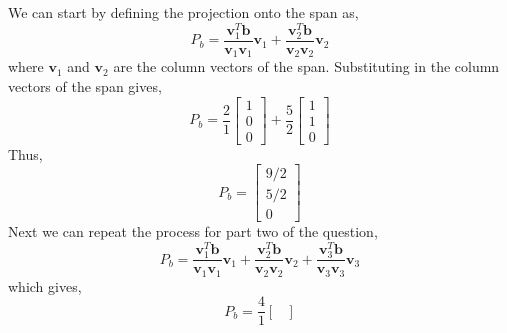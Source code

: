 \begin{mdframed}[style=MyFrame]
    We can start by defining the projection onto the span as,
    \begin{equation}
        P_{b} =  
            \frac{\mathbf{v}_{1}^{T} \mathbf{b}}
            {\mathbf{v}_{1} \mathbf{v}_{1}}
            \mathbf{v}_{1}
            +
            \frac{\mathbf{v}_{2}^{T} \mathbf{b}}
            {\mathbf{v}_{2} \mathbf{v}_{2}}
            \mathbf{v}_{2}
    \end{equation}
    where $\mathbf{v}_{1}$ and $\mathbf{v}_{2}$ are the column vectors of
    the span. Substituting in the column vectors of the span gives,
    \begin{equation}
        P_{b} = 
            \frac{2}{1}
            \begin{bmatrix}
                1       \\
                0       \\
                0
            \end{bmatrix}
            +
            \frac{5}{2}
            \begin{bmatrix}
                1       \\
                1       \\
                0
            \end{bmatrix}
    \end{equation}
    Thus,
    \begin{equation}
        P_{b} =
        \begin{bmatrix}
            9/2     \\
            5/2     \\
            0
        \end{bmatrix}
    \end{equation}
    Next we can repeat the process for part two of the question,
    \begin{equation}
        P_{b} = 
            \frac{\mathbf{v}_{1}^{T} \mathbf{b}}
            {\mathbf{v}_{1} \mathbf{v}_{1}}
            \mathbf{v}_{1}
            +
            \frac{\mathbf{v}_{2}^{T} \mathbf{b}}
            {\mathbf{v}_{2} \mathbf{v}_{2}}
            \mathbf{v}_{2}
            +
            \frac{\mathbf{v}_{3}^{T} \mathbf{b}}
            {\mathbf{v}_{3} \mathbf{v}_{3}}
            \mathbf{v}_{3}
    \end{equation}
    which gives,
    \begin{equation}
        P_{b} = 
            \frac{4}{1}
            \begin{bmatrix}

\end{bmatrix}
\end{equation}
\end{mdframed}
